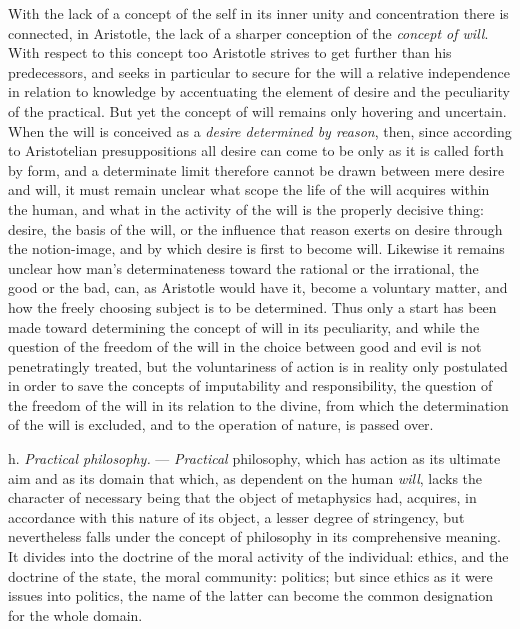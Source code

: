 With the lack of a concept of the self in its inner unity and concentration there is connected, in Aristotle, the lack of a sharper conception of the \emph{concept of will}. With respect to this concept too Aristotle strives to get further than his predecessors, and seeks in particular to secure for the will a relative independence in relation to knowledge by accentuating the element of desire and the peculiarity of the practical. But yet the concept of will remains only hovering and uncertain. When the will is conceived as a \emph{desire determined by reason}, then, since according to Aristotelian presuppositions all desire can come to be only as it is called forth by form, and a determinate limit therefore cannot be drawn between mere desire and will, it must remain unclear what scope the life of the will acquires within
the human, and what in the activity of the will is the properly decisive thing: desire, the basis of the will, or the influence that reason exerts on desire through the notion-image, and by which desire is first to become will. Likewise it remains unclear how man's determinateness toward the rational or the irrational, the good or the bad, can, as Aristotle would have it, become a voluntary matter, and how the freely choosing subject is to be determined. Thus only a start has been made toward determining the concept of will in its peculiarity, and while the question of the freedom of the will in the choice between good and evil is not penetratingly treated, but the voluntariness of action is in reality only postulated in order to save the concepts of imputability and responsibility, the question of the freedom of the will in its relation to the divine, from which the determination of the will is excluded, and to the operation of nature, is passed over.

\divrule

h. \emph{Practical philosophy.} --- \emph{Practical}
philosophy, which has action as its ultimate aim and as its
domain that which, as dependent on the human \emph{will},
lacks the character of necessary being that the object of metaphysics had, acquires, in accordance with this nature of its object, a lesser degree of stringency, but nevertheless falls
under the concept of philosophy in its comprehensive meaning.
It divides into the doctrine of the moral activity of the individual:
ethics, and the doctrine of the state, the moral community: politics; but since ethics as it were issues into politics, the
name of the latter can become the common designation for the whole domain.

